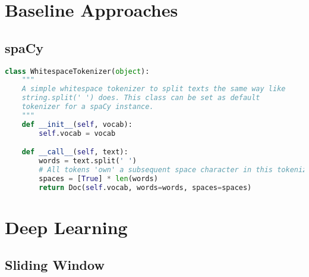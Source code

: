 \section{Baseline Approaches}

\subsection{spaCy}

\begin{lstlisting}[language=Python, label={code:tokenizer}, caption=Custom whitespace tokenizer]
class WhitespaceTokenizer(object):
    """
    A simple whitespace tokenizer to split texts the same way like
    string.split(' ') does. This class can be set as default
    tokenizer for a spaCy instance.
    """
    def __init__(self, vocab):
        self.vocab = vocab

    def __call__(self, text):
        words = text.split(' ')
        # All tokens 'own' a subsequent space character in this tokenizer
        spaces = [True] * len(words)
        return Doc(self.vocab, words=words, spaces=spaces)
\end{lstlisting}

\section{Deep Learning}

\subsection{Sliding Window}

